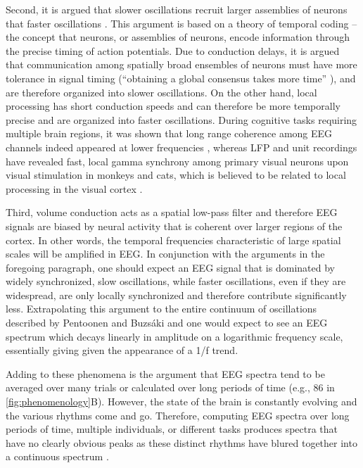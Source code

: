 Second, it is argued that slower oscillations recruit larger assemblies of neurons that faster oscillations \cite{Buzsaki2006, Buzsaki2012c, Buzsaki2010}. This argument is based on a theory of temporal coding -- the concept that neurons, or assemblies of neurons, encode information through the precise timing of action potentials. Due to conduction delays, it is argued that communication among spatially broad ensembles of neurons must have more tolerance in signal timing (``obtaining a global consensus takes more time'' \cite{Buzsaki2006}), and are therefore organized into slower oscillations. On the other hand, local processing has short conduction speeds and can therefore be more temporally precise and are organized into faster oscillations. During cognitive tasks requiring multiple brain regions, it was shown that long range coherence among EEG channels indeed appeared at lower frequencies \cite{Sarnthein1998,VonStein1999}, whereas LFP and unit recordings have revealed fast, local gamma synchrony among primary visual neurons upon visual stimulation in monkeys and cats, which is believed to be related to local processing in the visual cortex \cite{Gray1989,Eckhorn1994}.

Third, volume conduction acts as a spatial low-pass filter \cite{Nunez2006} and therefore EEG signals are biased by neural activity that is coherent over larger regions of the cortex. In other words, the temporal frequencies characteristic of large spatial scales will be amplified in EEG. In conjunction with the arguments in the foregoing paragraph, one should expect an EEG signal that is dominated by widely synchronized, slow oscillations, while faster oscillations, even if they are widespread, are only locally synchronized and therefore contribute significantly less. Extrapolating this argument to the entire continuum of oscillations described by Pentoonen and Buzsáki \cite{Penttonen2003} and one would expect to see an EEG spectrum which decays linearly in amplitude on a logarithmic frequency scale, essentially giving given the appearance of a 1/f trend.

Adding to these phenomena is the argument that EEG spectra tend to be averaged over many trials or calculated over long periods of time (e.g., \qty{86}{\min} in \autoref{fig:phenomenology}B). However, the state of the brain is constantly evolving and the various rhythms come and go. Therefore, computing EEG spectra over long periods of time, multiple individuals, or different tasks produces spectra that have no clearly obvious peaks as these distinct rhythms have blured together into a continuous spectrum \cite{Buzsaki2006}.

